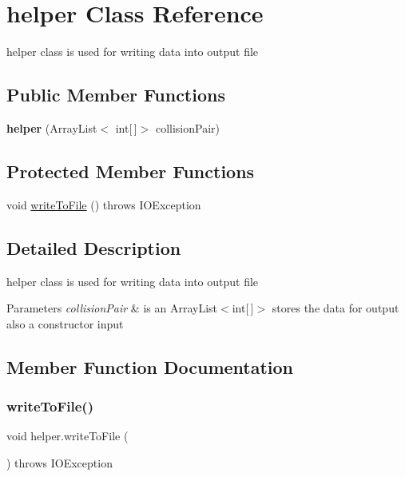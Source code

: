 \hypertarget{classhelper}{}\section{helper Class Reference}
\label{classhelper}


helper class is used for writing data into output file  


\subsection*{Public Member Functions}
\begin{DoxyCompactItemize}
\item 
\mbox{\label{classhelper_a5dfc9b8b321bc98e65b187fc26e11178}} 
{\bfseries helper} (Array\+List$<$ int\mbox{[}$\,$\mbox{]}$>$ collision\+Pair)
\end{DoxyCompactItemize}
\subsection*{Protected Member Functions}
\begin{DoxyCompactItemize}
\item 
void \mbox{\hyperlink{classhelper_a302277cc0ef6f69877eda1cae4ede979}{write\+To\+File}} ()  throws I\+O\+Exception 
\end{DoxyCompactItemize}


\subsection{Detailed Description}
helper class is used for writing data into output file 


\begin{DoxyParams}{Parameters}
{\em collision\+Pair} & is an Array\+List$<$int\mbox{[}$\,$\mbox{]}$>$ stores the data for output also a constructor input \\
\hline
\end{DoxyParams}


\subsection{Member Function Documentation}
\mbox{\label{classhelper_a302277cc0ef6f69877eda1cae4ede979}} 
\subsubsection{\texorpdfstring{write\+To\+File()}{writeToFile()}}
{\footnotesize\ttfamily void helper.\+write\+To\+File (\begin{DoxyParamCaption}{ }\end{DoxyParamCaption}) throws I\+O\+Exception\hspace{0.3cm}{\ttfamily [protected]}}

